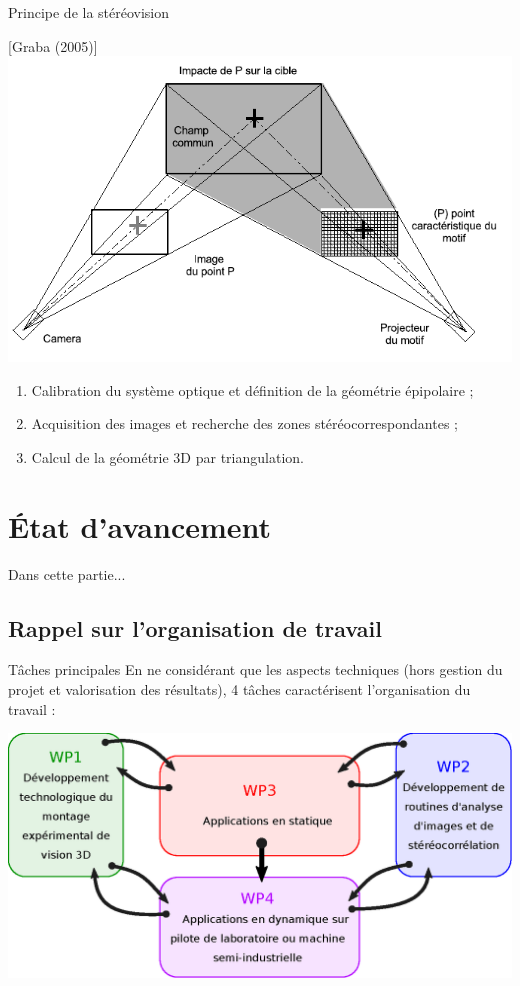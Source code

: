 \documentclass[8pt]{beamer}
\begin{document}
	\begin{frame}{Principe de la stéréovision}
		\begin{center}
			[Graba (2005)]\\
			\includegraphics[width=.7\textwidth]{stereovision.png}
		\end{center}
		\begin{enumerate}
			\item Calibration du système optique et définition de la géométrie épipolaire ;
			\item Acquisition des images et recherche des zones stéréocorrespondantes ;
			\item Calcul de la géométrie 3D par triangulation.
		\end{enumerate}
	\end{frame}

\section{\'Etat d'avancement}
\begin{frame}{Dans cette partie...}
	\tableofcontents[sectionstyle=show/shaded, subsectionstyle=show/show/shaded]
\end{frame}

\subsection{Rappel sur l'organisation de travail}
	\begin{frame}{Tâches principales}
		En ne considérant que les aspects techniques (hors gestion du projet et valorisation des résultats), 4 tâches caractérisent l'organisation du travail :
		\begin{center}
			\includegraphics[width=.9\textwidth]{taches.eps}
		\end{center}
	\end{frame}
\end{document}
